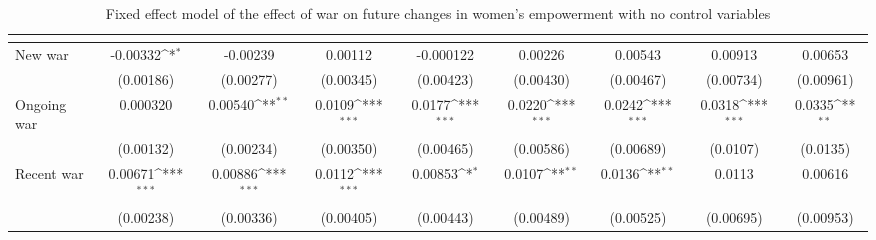 \begin{table}[htbp]\centering
\def\sym#1{\ifmmode^{#1}\else\(^{#1}\)\fi}
\caption{Fixed effect model of the effect of war on future changes in women's empowerment with no control variables\label{polemprobustwocontros}}
\begin{tabular}{l*{8}{c}}
\hline\hline
                    &&&&&&&&\\
\hline
New war             &    -0.00332\sym{*}  &    -0.00239         &     0.00112         &   -0.000122         &     0.00226         &     0.00543         &     0.00913         &     0.00653         \\
                    &   (0.00186)         &   (0.00277)         &   (0.00345)         &   (0.00423)         &   (0.00430)         &   (0.00467)         &   (0.00734)         &   (0.00961)         \\
[1em]
Ongoing war         &    0.000320         &     0.00540\sym{**} &      0.0109\sym{***}&      0.0177\sym{***}&      0.0220\sym{***}&      0.0242\sym{***}&      0.0318\sym{***}&      0.0335\sym{**} \\
                    &   (0.00132)         &   (0.00234)         &   (0.00350)         &   (0.00465)         &   (0.00586)         &   (0.00689)         &    (0.0107)         &    (0.0135)         \\
[1em]
Recent war          &     0.00671\sym{***}&     0.00886\sym{***}&      0.0112\sym{***}&     0.00853\sym{*}  &      0.0107\sym{**} &      0.0136\sym{**} &      0.0113         &     0.00616         \\
                    &   (0.00238)         &   (0.00336)         &   (0.00405)         &   (0.00443)         &   (0.00489)         &   (0.00525)         &   (0.00695)         &   (0.00953)         \\

\end{tabular}
\end{table}
